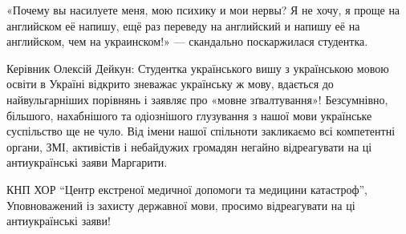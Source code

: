 «Почему вы насилуете меня, мою психику и мои нервы? Я не хочу, я проще на
английском её напишу, ещё раз переведу на английский и напишу её на английском,
чем на украинском!» — скандально поскаржилася студентка. 

Керівник Олексій Дейкун: Студентка українського вишу з українською мовою освіти
в Україні відкрито зневажає українську ж мову, вдається до найвульгарніших
порівнянь і заявляє про «мовне зґвалтування»! Безсумнівно, більшого,
нахабнішого та одіознішого глузування з нашої мови українське суспільство ще не
чуло. Від імени нашої спільноти закликаємо всі компетентні органи, ЗМІ,
активістів і небайдужих громадян негайно відреагувати на ці антиукраїнські
заяви Маргарити.

КНП ХОР \enquote{Центр екстреної медичної допомоги та медицини катастроф},
Уповноважений із захисту державної мови, просимо відреагувати на ці
антиукраїнські заяви!
